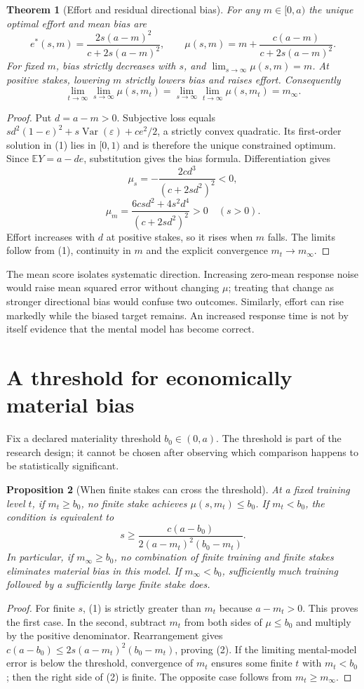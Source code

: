 \documentclass[11pt,a4paper]{article}
\newtheorem{theorem}{Theorem}[section]
\newtheorem{proposition}[theorem]{Proposition}
\theoremstyle{definition}
\theoremstyle{remark}
\newcommand{\E}{\mathbb{E}}
\DeclareMathOperator{\Var}{Var}
\begin{document}
\begin{theorem}[Effort and residual directional bias]
For any $m\in[0,a)$ the unique optimal effort and mean bias are
\[
 e^*(s,m)=\frac{2s(a-m)^2}{c+2s(a-m)^2},\qquad
 \mu(s,m)=m+\frac{c(a-m)}{c+2s(a-m)^2}.\tag{1}
\]
For fixed $m$, bias strictly decreases with $s$, and $\lim_{s\to\infty}\mu(s,m)=m$. At positive stakes, lowering $m$ strictly lowers bias and raises effort. Consequently
\[
 \lim_{t\to\infty}\lim_{s\to\infty}\mu(s,m_t)
 =\lim_{s\to\infty}\lim_{t\to\infty}\mu(s,m_t)=m_\infty.
\]
\end{theorem}
\begin{proof}
Put $d=a-m>0$. Subjective loss equals $s d^2(1-e)^2+s\Var(\varepsilon)+ce^2/2$, a strictly convex quadratic. Its first-order solution in (1) lies in $[0,1)$ and is therefore the unique constrained optimum. Since $\E Y=a-de$, substitution gives the bias formula. Differentiation gives
\[
 \mu_s=-\frac{2cd^3}{(c+2sd^2)^2}<0,
\]
\[
 \mu_m=\frac{6csd^2+4s^2d^4}{(c+2sd^2)^2}>0\quad(s>0).
\]
Effort increases with $d$ at positive stakes, so it rises when $m$ falls. The limits follow from (1), continuity in $m$ and the explicit convergence $m_t\to m_\infty$.
\end{proof}

The mean score isolates systematic direction. Increasing zero-mean response noise would raise mean squared error without changing $\mu$; treating that change as stronger directional bias would confuse two outcomes. Similarly, effort can rise markedly while the biased target remains. An increased response time is not by itself evidence that the mental model has become correct.

\section{A threshold for economically material bias}
Fix a declared materiality threshold $b_0\in(0,a)$. The threshold is part of the research design; it cannot be chosen after observing which comparison happens to be statistically significant.

\begin{proposition}[When finite stakes can cross the threshold]
At a fixed training level $t$, if $m_t\geq b_0$, no finite stake achieves $\mu(s,m_t)\leq b_0$. If $m_t<b_0$, the condition is equivalent to
\[
 s\geq\frac{c(a-b_0)}{2(a-m_t)^2(b_0-m_t)}.\tag{2}
\]
In particular, if $m_\infty\geq b_0$, no combination of finite training and finite stakes eliminates material bias in this model. If $m_\infty<b_0$, sufficiently much training followed by a sufficiently large finite stake does.
\end{proposition}
\begin{proof}
For finite $s$, (1) is strictly greater than $m_t$ because $a-m_t>0$. This proves the first case. In the second, subtract $m_t$ from both sides of $\mu\leq b_0$ and multiply by the positive denominator. Rearrangement gives $c(a-b_0)\leq2s(a-m_t)^2(b_0-m_t)$, proving (2). If the limiting mental-model error is below the threshold, convergence of $m_t$ ensures some finite $t$ with $m_t<b_0$; then the right side of (2) is finite. The opposite case follows from $m_t\geq m_\infty$.
\end{proof}
\end{document}
